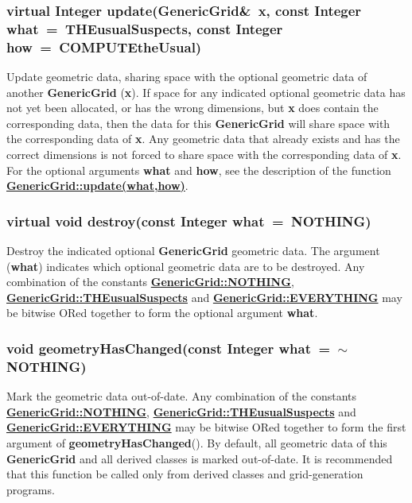 \documentclass{article}
\begin{document}
  \subsubsection{virtual Integer update(GenericGrid\&~x, const Integer what~=~THEusualSuspects, const Integer how~=~COMPUTEtheUsual)}
  \label{GenericGrid::update(x,what,how)}
    Update geometric data, sharing space with the optional geometric data of another \textbf{GenericGrid} (\textbf{x}).
    If space for any indicated optional geometric data has not yet been allocated, or has
    the wrong dimensions, but \textbf{x} does contain the corresponding data, then the data
    for this \textbf{GenericGrid} will share space with the corresponding data of \textbf{x}.
    Any geometric data that already exists and has the correct dimensions
    is not forced to share space with the corresponding data of \textbf{x}.
    For the optional arguments \textbf{what} and \textbf{how}, see the description of the function
    {\bf{}\hyperref{update(what,how)}{update(what,how) \rm(\S}{)}{GenericGrid::update(what,how)}}.
  \subsubsection{virtual void destroy(const Integer what~=~NOTHING)}
  \label{GenericGrid::destroy(what)}
    Destroy the indicated optional \textbf{GenericGrid} geometric data.
    The argument (\textbf{what}) indicates which optional
    geometric data are to be destroyed.  Any combination of the constants
    {\bf{}\hyperref{NOTHING}{NOTHING \rm(\S}{)}{GenericGrid::NOTHING}},
    {\bf{}\hyperref{THEusualSuspects}{THEusualSuspects \rm(\S}{)}{GenericGrid::THEusualSuspects}} and
    {\bf{}\hyperref{EVERYTHING}{EVERYTHING \rm(\S}{)}{GenericGrid::EVERYTHING}}
    may be bitwise ORed together to form the optional argument \textbf{what}.
  \subsubsection{void geometryHasChanged(const Integer what~=~$\sim$NOTHING)}
  \label{GenericGrid::geometryHasChanged(what)}
    Mark the geometric data out-of-date.  Any combination of the constants
    {\bf{}\hyperref{NOTHING}{NOTHING \rm(\S}{)}{GenericGrid::NOTHING}},
    {\bf{}\hyperref{THEusualSuspects}{THEusualSuspects \rm(\S}{)}{GenericGrid::THEusualSuspects}} and
    {\bf{}\hyperref{EVERYTHING}{EVERYTHING \rm(\S}{)}{GenericGrid::EVERYTHING}}
    may be bitwise ORed together to form the first argument of \textbf{geometryHasChanged}().
    By default, all geometric data of this \textbf{GenericGrid} and all derived classes is
    marked out-of-date.
    It is recommended that this function be called only from derived classes and grid-generation programs.
\end{document}
